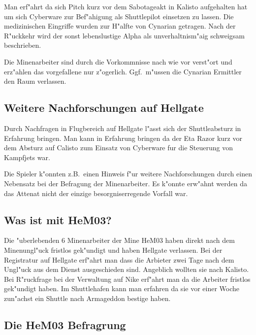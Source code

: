 Man erf"ahrt da\3 sich Pitch kurz vor dem Sabotageakt in Kalisto aufgehalten hat um sich Cyberware zur Bef"ahigung als Shuttlepilot einsetzen zu lassen. Die medizinischen Eingriffe wurden zur H"alfte von Cynarian getragen. Nach der R"uckkehr wird der sonst lebenslustige Alpha als unverhaltnism"a\3ig schweigsam beschrieben.

\begin{remarks}
Die Minenarbeiter sind durch die Vorkommnisse nach wie vor verst"ort und erz"ahlen das vorgefallene nur z"ogerlich. Ggf.~m"ussen die Cynarian Ermittler den Raum verlassen.
\end{remarks}

\subsection{Weitere Nachforschungen auf Hellgate}

Durch Nachfragen in Flugbereich auf Hellgate l"asst sich der Shuttleabsturz in Erfahrung bringen. Man kann in Erfahrung bringen da\3 der Eta Razor kurz vor dem Absturz auf Calisto zum Einsatz von Cyberware fur die Steuerung von Kampfjets war.

\begin{remarks}
Die Spieler k"onnten z.B.~einen Hinweis f"ur weitere Nachforschungen durch einen Nebensatz bei der Befragung der Minenarbeiter. Es k"onnte erw"ahnt werden da\3 das Attenat nicht der einzige besorgniserregende Vorfall war.
\end{remarks}

\subsection{Was ist mit HeM03?}

Die "uberlebenden 6 Minenarbeiter der Mine HeM03 haben direkt nach dem Minenungl"uck fristlos gek"undigt und haben Hellgate verlassen. Bei der Registratur auf Hellgate erf"ahrt man dass die Arbieter zwei Tage nach dem Ungl"uck aus dem Dienst ausgeschieden sind. Angeblich wollten sie nach Kalisto. Bei R"ruckfrage bei der Verwaltung auf
Nike erf"ahrt man da\3 die Arbeiter fristlos gek"undigt haben. Im Shuttlehafen kann man erfahren da\3 sie vor einer Woche zun"achst ein Shuttle nach Armageddon bestige haben.

\subsection{Die HeM03 Befragrung}

